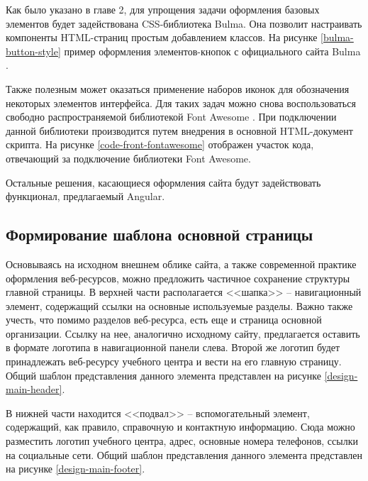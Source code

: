 Как было указано в главе 2, для упрощения задачи оформления базовых элементов будет задействована CSS-библиотека Bulma.
Она позволит настраивать компоненты HTML-страниц простым добавлением классов.
На рисунке \ref{bulma-button-style} пример оформления элементов-кнопок с официального сайта Bulma \cite{bulma}.


Также полезным может оказаться применение наборов иконок для обозначения некоторых элементов интерфейса.
Для таких задач можно снова воспользоваться свободно распространяемой библиотекой Font Awesome \cite{fontawesome}.
При подключении данной библиотеки производится путем внедрения в основной HTML-документ скрипта.
На рисунке \ref{code-front-fontawesome} отображен участок кода, отвечающий за подключение библиотеки Font Awesome.


Остальные решения, касающиеся оформления сайта будут задействовать функционал, предлагаемый Angular.


\subsection{Формирование шаблона основной страницы}

Основываясь на исходном внешнем облике сайта, а также современной практике оформления веб-ресурсов, можно предложить частичное сохранение структуры главной страницы.
В верхней части располагается <<шапка>> -- навигационный элемент, содержащий ссылки на основные используемые разделы.
Важно также учесть, что помимо разделов веб-ресурса, есть еще и страница основной организации.
Ссылку на нее, аналогично исходному сайту, предлагается оставить в формате логотипа в навигационной панели слева.
Второй же логотип будет принадлежать веб-ресурсу учебного центра и вести на его главную страницу.
Общий шаблон представления данного элемента представлен на рисунке \ref{design-main-header}.


В нижней части находится <<подвал>> -- вспомогательный элемент, содержащий, как правило, справочную и контактную информацию.
Сюда можно разместить логотип учебного центра, адрес, основные номера телефонов, ссылки на социальные сети.
Общий шаблон представления данного элемента представлен на рисунке \ref{design-main-footer}.

